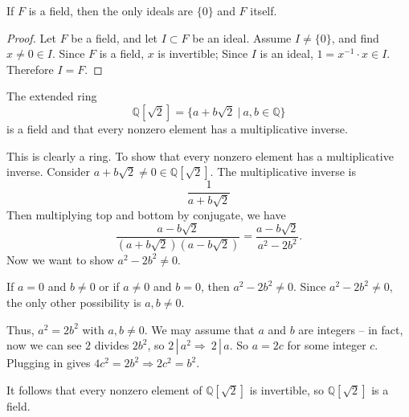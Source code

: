 \begin{definition}
    If $F$ is a field, then the only ideals are $\{0\}$ and $F$ itself.
\end{definition}
\begin{proof}
    Let $F$ be a field, and let $I \subset F$ be an ideal. Assume $I \neq \{0 \}$, and find $x \neq 0 \in I$. 
    Since  $F$ is a field, $x$ is invertible; Since $I$ is an ideal, $1 = x^{-1} \cdot x \in I$. Therefore $I = F$.
\end{proof}

\begin{example}
    The extended ring
    \[
        \mathbb{Q}[\sqrt{2}] = \{ a+b\sqrt{2} \> | \> a,b \in \mathbb{Q} \}
    \]
    is a field and that every nonzero element has a multiplicative inverse.
\end{example}
\begin{solution}
    This is clearly a ring. To show that every nonzero element has a multiplicative inverse. 
    Consider $a + b\sqrt{2} \neq 0 \in \mathbb{Q}[\sqrt{2}]$. The multiplicative inverse is 
    \[
        \frac{1}{a + b\sqrt{2}}
    \]
    Then multiplying top and bottom by conjugate, we have 
    \[
        \frac{a - b\sqrt{2}}{(a + b\sqrt{2})(a - b\sqrt{2})} = \frac{a - b\sqrt{2}}{a^2 - 2b^2}.
    \]
    Now we want to show $a^2 - 2b^2 \neq 0$.

    If $a = 0$ and $b \neq 0$ or if $a \neq 0$ and $b=0$, then $a^2 - 2b^2 \neq 0$. Since 
    $a^2 - 2b^2 \neq 0$, the only other possibility is $a, b \neq 0$.

    Thus, $a^2 = 2b^2$ with $a,b \neq 0$. We may assume that $a$ and $b$ are integers -- 
    in fact, now we can see $2$ divides $2b^2$, so $2 \,| \, a^2 \Longrightarrow \> 2 \, | \, a$. So 
    $a = 2c$ for some integer $c$. Plugging in gives $4c^2 = 2b^2 \Longrightarrow 2c^2 = b^2$.

    It follows that every nonzero element of $\mathbb{Q}[\sqrt{2}]$ is invertible, so 
    $\mathbb{Q}[\sqrt{2}]$ is a field.
\end{solution}

